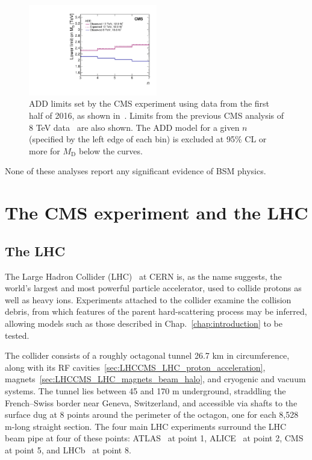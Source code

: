 \documentclass[oneside, letterpaper, 12pt, oldfontcommands]{memoir}
\begin{document}
\begin{figure}[hbtp]
  \begin{center}
    \includegraphics[width=0.50\textwidth]{Figures/add_cms_earlylimits_MD.pdf}
    \caption{
    ADD limits set by the CMS experiment using data from the first half of 2016, as shown in~\cite{ref:JHEP10(2017)073}.
    Limits from the previous CMS analysis of 8 TeV data~\cite{ref:j.physletb.2016.01.057} are also shown.
    The ADD model for a given $n$ (specified by the left edge of each bin) is excluded at 95\% CL or more for $M_\mathrm{D}$ below the curves.
    }
    \label{fig:add_cms_earlylimits_MD}
  \end{center}
\end{figure}

None of these analyses report any significant evidence of BSM physics.

\chapter{The CMS experiment and the LHC} \label{chap:LHCCMS}
\section{The LHC} \label{sec:LHCCMS_LHC}
The Large Hadron Collider (LHC)~\cite{ref:1748-0221/3/08/S08001} at CERN is, as the name suggests, the world's largest
and most powerful particle accelerator, used to collide protons as well as heavy ions.
Experiments attached to the collider examine the collision debris, from which features of the
parent hard-scattering process may be inferred, allowing models such as those described in
Chap.~\ref{chap:introduction} to be tested.

The collider consists of a roughly octagonal tunnel 26.7 km in circumference, along with
its RF cavities~\ref{sec:LHCCMS_LHC_proton_acceleration}, magnets~\ref{sec:LHCCMS_LHC_magnets_beam_halo},
and cryogenic and vacuum systems. The tunnel lies between 45 and 170 m underground, straddling
the French--Swiss border near Geneva, Switzerland, and accessible via shafts to the surface
dug at 8 points around the perimeter of the octagon, one for each 8,528 m-long straight
section. The four main LHC experiments surround the LHC beam pipe at four of these points: ATLAS~\cite{ref:10.1088/1748-0221/3/08/S08003}
at point 1, ALICE~\cite{ref:1748-0221/3/08/S08002} at point 2, CMS~\cite{ref:1748-0221/3/08/S08004} at point 5, and LHCb~\cite{ref:1748-0221/3/08/S08005} at point 8.
\end{document}
